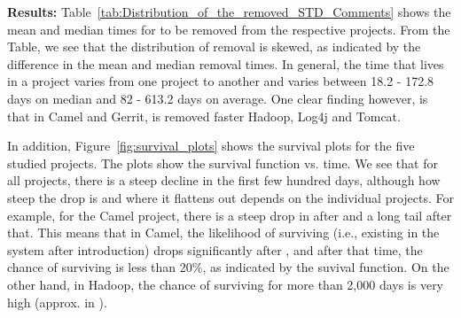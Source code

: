 


\noindent \textbf{Results:} Table~\ref{tab:Distribution_of_the_removed_STD_Comments} shows the mean and median times for \SATD to be removed from the respective projects. From the Table, we see that the distribution of \SATD removal is skewed, as indicated by the difference in the mean and median removal times. In general, the time that \SATD lives in a project  varies from one project to another and varies between 18.2 - 172.8 days on median and 82 - 613.2 days on average. One clear finding however, is that in Camel and Gerrit, \SATD is removed faster Hadoop, Log4j and Tomcat.

In addition, Figure~\ref{fig:survival_plots} shows the survival plots for the five studied projects. The plots show the survival function vs. time. We see that for all projects, there is a steep decline in the first few hundred days, although how steep the drop is and where it flattens out depends on the individual projects. For example, for the Camel project, there is a steep drop in \SATD after  and a long tail after that. This means that in Camel, the likelihood of \SATD surviving (i.e., existing in the system after introduction) drops significantly after , and after that time, the chance of surviving is less than 20\%, as indicated by the suvival function. On the other hand, in Hadoop, the chance of \SATD surviving for more than 2,000 days is very high (approx. in ). 

